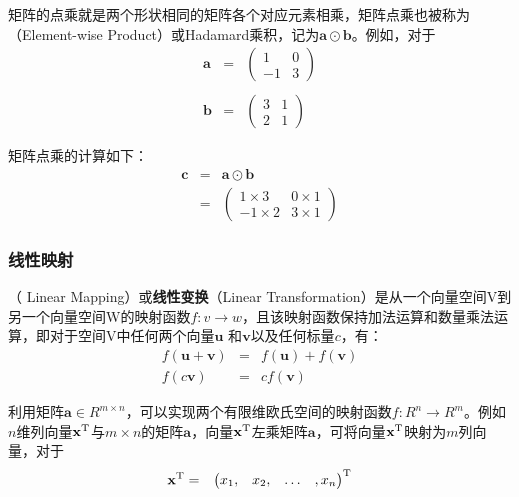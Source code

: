 \parinterval 矩阵的点乘就是两个形状相同的矩阵各个对应元素相乘，矩阵点乘也被称为{\small{}}（Element-wise Product）或Hadamard乘积，记为$ \mathbf a \odot \mathbf b$。例如，对于
\begin{eqnarray}
\mathbf a &=&
\begin{pmatrix}
   1 & 0\\
   -1 & 3
\end{pmatrix}
\\ \nonumber \\
\mathbf b &=&
\begin{pmatrix}
   3 & 1\\
   2 & 1
\end{pmatrix}
\end{eqnarray}

\parinterval 矩阵点乘的计算如下：
\begin{eqnarray}
\mathbf c & = & \mathbf a\odot \mathbf b \nonumber \\
          & = & \begin{pmatrix}
   1\times 3 & 0\times1\\
   -1\times2 & 3\times1
\end{pmatrix}
\label{eq:5-8}
\end{eqnarray}


\subsubsection{线性映射}

（ Linear Mapping）或{\small\sffamily\bfseries{线性变换}}（Linear Transformation）是从一个向量空间V到另一个向量空间W的映射函数$ f:v\rightarrow w$，且该映射函数保持加法运算和数量乘法运算，即对于空间V中任何两个向量$ \mathbf u $ 和$ \mathbf v $以及任何标量$ c $，有：
\begin{eqnarray}
f(\mathbf u+\mathbf v)&=&f(\mathbf u)+f(\mathbf v)\label{eq:5-9}\\
f(c\mathbf v)&=&cf(\mathbf v)
\label{eq:5-10}
\end{eqnarray}

\parinterval 利用矩阵$ \mathbf a\in R^{m\times n} $，可以实现两个有限维欧氏空间的映射函数$f:R^n\rightarrow R^m$。例如$ n $维列向量$ \mathbf x ^{\rm T}$与$ m\times n $的矩阵$ \mathbf a $，向量$ \mathbf x ^{\rm T}$左乘矩阵$ \mathbf a $，可将向量$ \mathbf x ^{\rm T}$映射为$ m $列向量，对于
\begin{eqnarray}
\mathbf x^{\textrm{T}} & = & {\begin{pmatrix} x_1, & x_2, & \dots &, x_n \end{pmatrix}}^{\rm T}
\label{eq:5-11}
\end{eqnarray}

